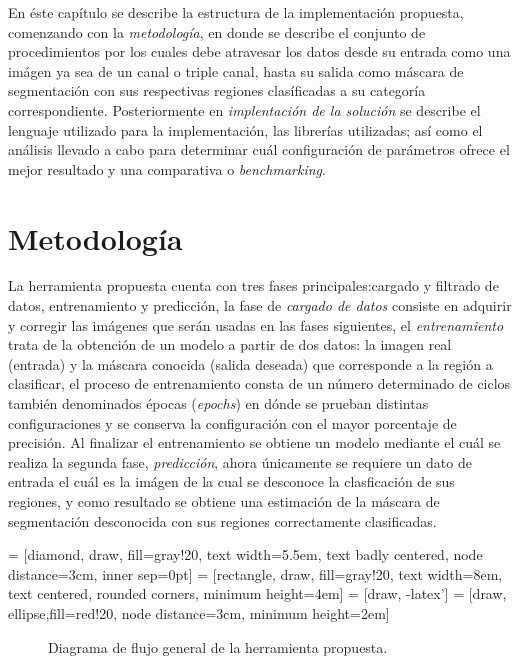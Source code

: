 En éste capítulo se describe la estructura de la implementación propuesta, comenzando con la \emph{metodología}, en donde se describe el conjunto de procedimientos por los cuales debe atravesar los datos desde su entrada como una imágen ya sea de un canal o triple canal, hasta su salida como máscara de segmentación con sus respectivas regiones clasíficadas a su categoría correspondiente. Posteriormente en \emph{implentación de la solución} se describe el lenguaje utilizado para la implementación, las librerías utilizadas; así como el análisis llevado a cabo para determinar cuál configuración de parámetros ofrece el mejor resultado y una comparativa o \emph{benchmarking}.

\section{Metodología}
La herramienta propuesta cuenta con tres fases principales:cargado y filtrado de datos, entrenamiento y predicción, la fase de \emph{cargado de datos} consiste en adquirir y corregir las imágenes que serán usadas en las fases siguientes, el \emph{entrenamiento} trata de la obtención de un modelo a partir de dos datos: la imagen real (entrada) y la máscara conocida (salida deseada) que corresponde a la región a clasificar, el proceso de entrenamiento consta de un número determinado de ciclos también denominados épocas (\emph{epochs}) en dónde se prueban distintas configuraciones y se conserva la configuración con el mayor porcentaje de precisión. Al finalizar el entrenamiento se obtiene un modelo mediante el cuál se realiza la segunda fase, \emph{predicción}, ahora únicamente se requiere un dato de entrada el cuál es la imágen de la cual se desconoce la clasficación de sus regiones, y como resultado se obtiene una estimación de la máscara de segmentación desconocida con sus regiones correctamente clasificadas.

 = [diamond, draw, fill=gray!20, 
    text width=5.5em, text badly centered, node distance=3cm, inner sep=0pt]
 = [rectangle, draw, fill=gray!20, 
    text width=8em, text centered, rounded corners, minimum height=4em]
 = [draw, -latex']
 = [draw, ellipse,fill=red!20, node distance=3cm,
    minimum height=2em]

\begin{figure}[H]
\centering    
{}
\caption{Diagrama de flujo general de la herramienta propuesta.}
\end{figure}


